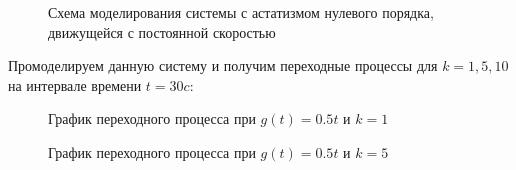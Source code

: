 \documentclass[a4paper, 11pt]{article}
\begin{document}
\begin{figure}[h!]
\caption{Схема моделирования системы с астатизмом нулевого порядка, движущейся с постоянной скоростью}
\label{ris:image}
\end{figure}

\par 
Промоделируем данную систему и получим переходные процессы для $k=1,5,10$ на интервале времени $t=30c$:

\begin{figure}[h!]
\caption{График переходного процесса при $g(t) = 0.5t$ и $k = 1$}
\label{ris:image}
\end{figure}

\newpage
\begin{figure}[h!]
\caption{График переходного процесса при $g(t) = 0.5t$ и $k = 5$}
\label{ris:image}
\end{figure}
\end{document}
